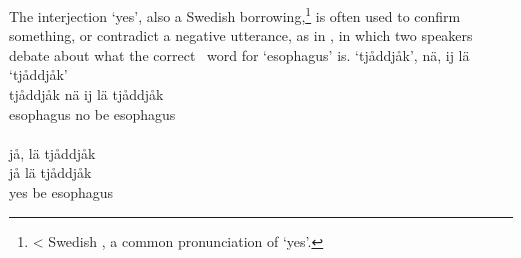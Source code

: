 The interjection  ‘yes’, also a Swedish borrowing,\footnote{< Swedish , a common pronunciation of  ‘yes’.} 
is often used to confirm something, or contradict a negative utterance, as in , in which two speakers debate about what the correct \PS\ word for ‘esophagus’ is. 
\ea\label{particleEx7}
\glll	{} ‘tjåddjåk’, nä, ij lä ‘tjåddjåk’\\
	{} tjåddjåk nä ij lä tjåddjåk\\
	{} esophagus\BS{} no \BS{} be\BS{} esophagus\BS{}\\\nopagebreak
{}\\
\glll	{} jå, lä tjåddjåk\\
	{} jå lä tjåddjåk\\
	{} yes be\BS{} esophagus\BS{}\\\nopagebreak
{}	
\z








%
